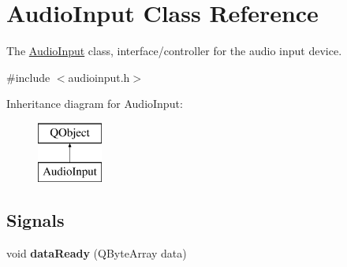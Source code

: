 \hypertarget{class_audio_input}{\section{Audio\+Input Class Reference}
\label{class_audio_input}
}


The \hyperlink{class_audio_input}{Audio\+Input} class, interface/controller for the audio input device.  




{\ttfamily \#include $<$audioinput.\+h$>$}

Inheritance diagram for Audio\+Input\+:\begin{figure}[H]
\begin{center}
\leavevmode
\includegraphics[height=2.000000cm]{class_audio_input}
\end{center}
\end{figure}
\subsection*{Signals}
\begin{DoxyCompactItemize}
\item 
\hypertarget{class_audio_input_a145b9998b45bf913ded725f47f9dfdf2}{void {\bfseries data\+Ready} (Q\+Byte\+Array data)}\label{class_audio_input_a145b9998b45bf913ded725f47f9dfdf2}

\end{DoxyCompactItemize}
